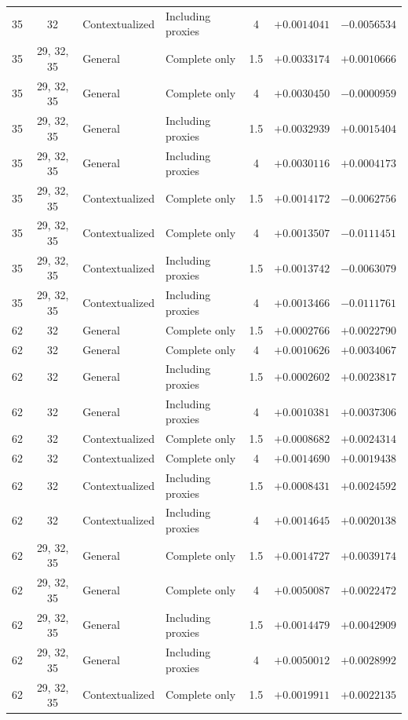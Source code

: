 \begin{table}[p]
\begin{tabular*}{\textwidth}{@{\extracolsep{\fill}}ccllcrr@{}}
35 & 32 & Contextualized & Including proxies & 4 & $+0.0014041$ & $-0.0056534$ \\
35 & 29, 32, 35 & General & Complete only & 1.5 & $+0.0033174$ & $+0.0010666$ \\
35 & 29, 32, 35 & General & Complete only & 4 & $+0.0030450$ & $-0.0000959$ \\
35 & 29, 32, 35 & General & Including proxies & 1.5 & $+0.0032939$ & $+0.0015404$ \\
35 & 29, 32, 35 & General & Including proxies & 4 & $+0.0030116$ & $+0.0004173$ \\
35 & 29, 32, 35 & Contextualized & Complete only & 1.5 & $+0.0014172$ & $-0.0062756$ \\
35 & 29, 32, 35 & Contextualized & Complete only & 4 & $+0.0013507$ & $-0.0111451$ \\
35 & 29, 32, 35 & Contextualized & Including proxies & 1.5 & $+0.0013742$ & $-0.0063079$ \\
35 & 29, 32, 35 & Contextualized & Including proxies & 4 & $+0.0013466$ & $-0.0111761$ \\
\midrule
62 & 32 & General & Complete only & 1.5 & $+0.0002766$ & $+0.0022790$ \\
62 & 32 & General & Complete only & 4 & $+0.0010626$ & $+0.0034067$ \\
62 & 32 & General & Including proxies & 1.5 & $+0.0002602$ & $+0.0023817$ \\
62 & 32 & General & Including proxies & 4 & $+0.0010381$ & $+0.0037306$ \\
62 & 32 & Contextualized & Complete only & 1.5 & $+0.0008682$ & $+0.0024314$ \\
62 & 32 & Contextualized & Complete only & 4 & $+0.0014690$ & $+0.0019438$ \\
62 & 32 & Contextualized & Including proxies & 1.5 & $+0.0008431$ & $+0.0024592$ \\
62 & 32 & Contextualized & Including proxies & 4 & $+0.0014645$ & $+0.0020138$ \\
62 & 29, 32, 35 & General & Complete only & 1.5 & $+0.0014727$ & $+0.0039174$ \\
62 & 29, 32, 35 & General & Complete only & 4 & $+0.0050087$ & $+0.0022472$ \\
62 & 29, 32, 35 & General & Including proxies & 1.5 & $+0.0014479$ & $+0.0042909$ \\
62 & 29, 32, 35 & General & Including proxies & 4 & $+0.0050012$ & $+0.0028992$ \\
62 & 29, 32, 35 & Contextualized & Complete only & 1.5 & $+0.0019911$ & $+0.0022135$ \\

\end{tabular*}
\end{table}
